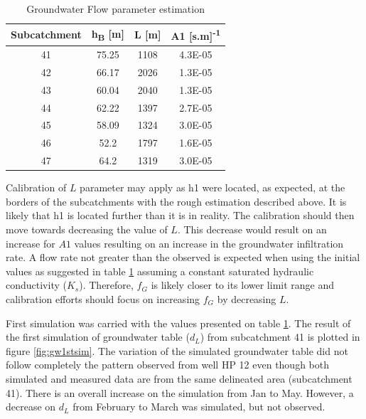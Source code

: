 \begin{table}[h]
\caption{Groundwater Flow parameter estimation}
\label{tbl:gwparamest}
\centering
\begin{tabular}{cccc}
\toprule
\multicolumn{1}{l}{\textbf{Subcatchment}} & \textbf{h\textsubscript{B} {[}m{]}} & \textbf{L {[}m{]}} & \textbf{A1  {[}s.m{]}\textsuperscript{-1}} \\ \hline
41                                        & 75.25                 & 1108               & 4.3E-05                                    \\
42                                        & 66.17                 & 2026               & 1.3E-05                                    \\
43                                        & 60.04                 & 2040               & 1.3E-05                                    \\
44                                        & 62.22                 & 1397               & 2.7E-05                                    \\
45                                        & 58.09                 & 1324               & 3.0E-05                                    \\
46                                        & 52.2                  & 1797               & 1.6E-05                                    \\
47                                        & 64.2                  & 1319               & 3.0E-05                                   \\
\bottomrule
\end{tabular}
\end{table}
 
 
Calibration of $L$ parameter may apply as h1 were located, as expected, at the borders of the subcatchments with the rough estimation described above. It is likely that h1 is located further than it is in reality. The calibration should then move towards decreasing the value of $L$. This decrease would result on an increase for $A1$ values resulting on an increase in the groundwater infiltration rate. A flow rate not greater than the observed is expected when using the initial values as suggested in table \ref{tbl:gwparamest} assuming a constant saturated hydraulic conductivity ($K_s$). Therefore, $f_G$ is likely closer to its lower limit range and calibration efforts should focus on increasing $f_G$ by decreasing $L$. 

First simulation was carried with the values presented on table \ref{tbl:gwparamest}. The result of the first simulation of groundwater table ($d_L$) from subcatchment 41 is plotted in figure \ref{fig:gw1stsim}. The variation of the simulated groundwater table did not follow completely the pattern observed from well HP 12 even though both simulated and measured data are from the same delineated area (subcatchment 41). There is an overall increase on the simulation from Jan to May. However, a decrease on $d_L$ from February to March was simulated, but not observed.

